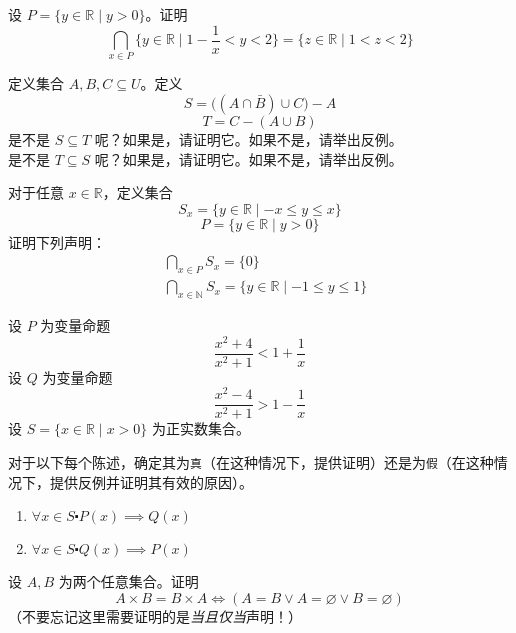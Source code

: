 \begin{exercise}
    设 $P = \{y \in \mathbb{R} \mid y > 0\}$。证明
    \[\bigcap_{x \in P} \Big\{y \in \mathbb{R} \mid 1-\frac{1}{x} < y < 2\Big\} = \{z \in \mathbb{R} \mid 1 < z <2\}\]
\end{exercise}

\begin{exercise}
    定义集合 $A, B, C \subseteq U$。定义
    \[S = \big((A \cap \bar{B}) \cup C \big)-A\]
    \[T = C-(A \cup B)\]
    是不是 $S \subseteq T$ 呢？如果是，请证明它。如果不是，请举出反例。\\
    是不是 $T \subseteq S$ 呢？如果是，请证明它。如果不是，请举出反例。
\end{exercise}

\begin{exercise}
    对于任意 $x \in \mathbb{R}$，定义集合
    \[S_x = \{y \in \mathbb{R} \mid -x \le y \le x\}\]
    \[P = \{y \in \mathbb{R} \mid y > 0\}\]
    证明下列声明：
    \begin{align*}
        &\bigcap_{x \in P} S_x = \{0\} \\
        &\bigcap_{x \in \mathbb{N}} S_x = \{y \in \mathbb{R} \mid -1 \le y \le 1\}
    \end{align*}
\end{exercise}

\begin{exercise} \label{ex:exercises4.11.22}
    设 $P$ 为变量命题
    \[\frac{x^2+4}{x^2+1} < 1+\frac{1}{x}\]
    设 $Q$ 为变量命题
    \[\frac{x^2-4}{x^2+1} > 1-\frac{1}{x}\]
    设 $S = \{x \in \mathbb{R} \mid x > 0\}$ 为正实数集合。

    对于以下每个陈述，确定其为\verb|真|（在这种情况下，提供证明）还是为\verb|假|（在这种情况下，提供反例并证明其有效的原因）。

    \begin{enumerate}[label=(\alph*)]
        \item $\forall x \in S \centerdot P(x) \implies Q(x)$
        \item $\forall x \in S \centerdot Q(x) \implies P(x)$
    \end{enumerate}  
\end{exercise}

\begin{exercise}
    设 $A, B$ 为两个任意集合。证明
    \[A \times B = B \times A \iff (A = B \lor A = \varnothing \lor B = \varnothing)\]
    （不要忘记这里需要证明的是\emph{当且仅当}声明！）
\end{exercise}

